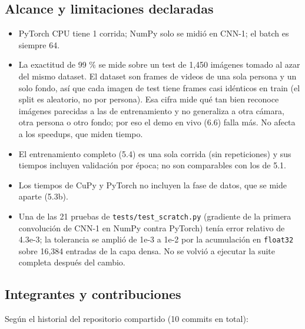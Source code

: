 \documentclass[
  11pt,
]{article}
\providecommand{\tightlist}{%
  \setlength{\itemsep}{0pt}\setlength{\parskip}{0pt}}
\begin{document}
\subsection{Alcance y limitaciones declaradas}

\begin{itemize}
\tightlist
\item PyTorch CPU tiene 1 corrida; NumPy solo se midió en CNN-1; el batch es siempre 64.
\item La exactitud de 99 \% se mide sobre un test de 1,450 imágenes tomado al azar del mismo dataset. El dataset son frames de videos de una sola persona y un solo fondo, así que cada imagen de test tiene frames casi idénticos en train (el split es aleatorio, no por persona). Esa cifra mide qué tan bien reconoce imágenes parecidas a las de entrenamiento y no generaliza a otra cámara, otra persona o otro fondo; por eso el demo en vivo (6.6) falla más. No afecta a los speedups, que miden tiempo.
\item El entrenamiento completo (5.4) es una sola corrida (sin repeticiones) y sus tiempos incluyen validación por época; no son comparables con los de 5.1.
\item Los tiempos de CuPy y PyTorch no incluyen la fase de datos, que se mide aparte (5.3b).
\item Una de las 21 pruebas de \texttt{tests/test\_scratch.py} (gradiente de la primera convolución de
  CNN-1 en NumPy contra PyTorch) tenía error relativo de 4.3e-3; la tolerancia se amplió de
  1e-3 a 1e-2 por la acumulación en \texttt{float32} sobre 16,384 entradas de la capa densa. No se volvió a
  ejecutar la suite completa después del cambio.
\end{itemize}

\subsection{Integrantes y contribuciones}

Según el historial del repositorio compartido (10 commits en total):
\end{document}
